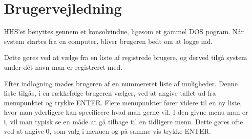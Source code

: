 
\section{Brugervejledning}

HHS'et benyttes gennem et konsolvindue, ligesom et gammel DOS pogram.
Når system startes fra en computer, bliver brugeren bedt om at logge ind.

Dette gøres ved at vælge fra en liste af registrede brugere, og derved tilgå system under dét navn man er registreret med.

Efter indlogning  mødes brugeren af en nummereret liste af muligheder.
Denne liste tilgås, i en rækkefølge brugeren vælger, ved at angive tallet ud fra menupunktet og trykke ENTER.
Flere menupunkter fører videre til en ny liste, hvor man yderligere kan specificere hvad man gerne vil.
I den givne menu man er i, vil man typisk se en måde at gå tilbage til en tidligere menu.
Dette gøres ofte ved at angive 0, som valg i menuen og på samme vis trykke ENTER.